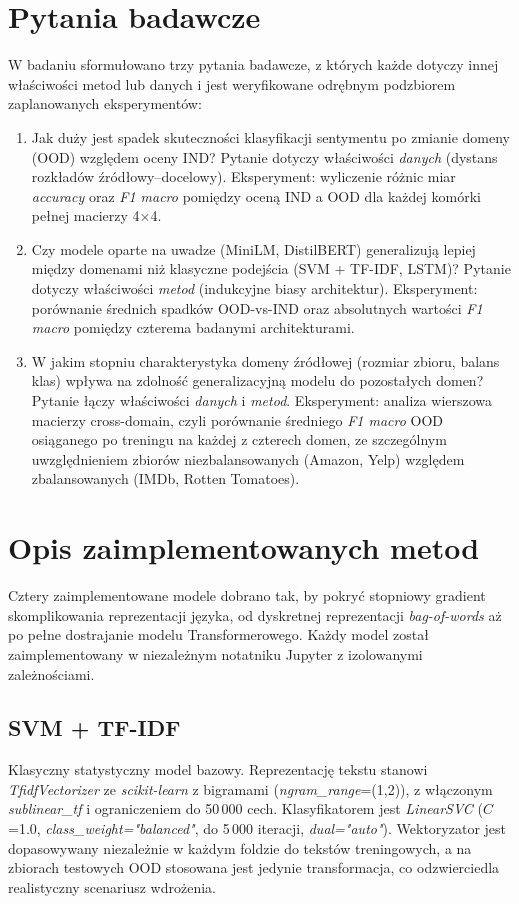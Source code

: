 \documentclass[runningheads]{llncs}
\begin{document}
\section*{Pytania badawcze}
W badaniu sformułowano trzy pytania badawcze, z których każde dotyczy innej właściwości metod lub danych i jest weryfikowane odrębnym podzbiorem zaplanowanych eksperymentów:
\begin{enumerate}[label=\textbf{RQ \arabic*.}, leftmargin=*, labelsep=0.6em]
    \item Jak duży jest spadek skuteczności klasyfikacji sentymentu po zmianie domeny (OOD) względem oceny IND? Pytanie dotyczy właściwości \emph{danych} (dystans rozkładów źródłowy--docelowy). Eksperyment: wyliczenie różnic miar \textit{accuracy} oraz \textit{F1 macro} pomiędzy oceną IND a OOD dla każdej komórki pełnej macierzy 4$\times$4.
    \item Czy modele oparte na uwadze (MiniLM, DistilBERT) generalizują lepiej między domenami niż klasyczne podejścia (SVM + TF-IDF, LSTM)? Pytanie dotyczy właściwości \emph{metod} (indukcyjne biasy architektur). Eksperyment: porównanie średnich spadków OOD-vs-IND oraz absolutnych wartości \textit{F1 macro} pomiędzy czterema badanymi architekturami.
    \item W jakim stopniu charakterystyka domeny źródłowej (rozmiar zbioru, balans klas) wpływa na zdolność generalizacyjną modelu do pozostałych domen? Pytanie łączy właściwości \emph{danych} i \emph{metod}. Eksperyment: analiza wierszowa macierzy cross-domain, czyli porównanie średniego \textit{F1 macro} OOD osiąganego po treningu na każdej z czterech domen, ze szczególnym uwzględnieniem zbiorów niezbalansowanych (Amazon, Yelp) względem zbalansowanych (IMDb, Rotten Tomatoes).
\end{enumerate}

\section*{Opis zaimplementowanych metod}
Cztery zaimplementowane modele dobrano tak, by pokryć stopniowy gradient skomplikowania reprezentacji języka, od dyskretnej reprezentacji \textit{bag-of-words} aż po pełne dostrajanie modelu Transformerowego. Każdy model został zaimplementowany w niezależnym notatniku Jupyter z izolowanymi zależnościami.

\subsection*{SVM + TF-IDF}
Klasyczny statystyczny model bazowy. Reprezentację tekstu stanowi \textit{TfidfVectorizer} ze \textit{scikit-learn} z bigramami (\textit{ngram\_range}=(1,2)), z włączonym \textit{sublinear\_tf} i ograniczeniem do 50\,000 cech. Klasyfikatorem jest \textit{LinearSVC} ($C$=1.0, \textit{class\_weight="balanced"}, do 5\,000 iteracji, \textit{dual="auto"}). Wektoryzator jest dopasowywany niezależnie w każdym foldzie do tekstów treningowych, a na zbiorach testowych OOD stosowana jest jedynie transformacja, co odzwierciedla realistyczny scenariusz wdrożenia.
\end{document}
